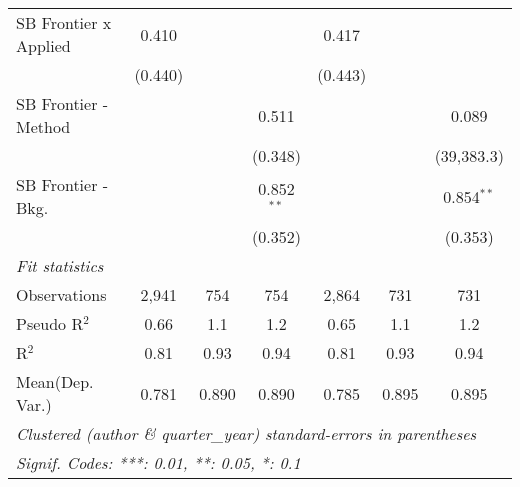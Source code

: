 \begin{tabular}{lcccccc}
   SB Frontier x Applied        & 0.410         &             &              & 0.417         &             &   \\   
                                & (0.440)       &             &              & (0.443)       &             &   \\   
   SB Frontier - Method         &               &             & 0.511        &               &             & 0.089\\   
                                &               &             & (0.348)      &               &             & (39,383.3)\\   
   SB Frontier - Bkg.           &               &             & 0.852$^{**}$ &               &             & 0.854$^{**}$\\   
                                &               &             & (0.352)      &               &             & (0.353)\\   
   \midrule
   \emph{Fit statistics}\\
   Observations                 & 2,941         & 754         & 754          & 2,864         & 731         & 731\\  
   Pseudo R$^2$                 & 0.66          & 1.1         & 1.2          & 0.65          & 1.1         & 1.2\\  
   R$^2$                        & 0.81          & 0.93        & 0.94         & 0.81          & 0.93        & 0.94\\  
Mean(Dep. Var.) & 0.781 & 0.890 & 0.890 & 0.785 & 0.895 & 0.895 \\
   \midrule \midrule
   \multicolumn{7}{l}{\emph{Clustered (author \& quarter\_year) standard-errors in parentheses}}\\
   \multicolumn{7}{l}{\emph{Signif. Codes: ***: 0.01, **: 0.05, *: 0.1}}\\
\end{tabular}
\par\endgroup
